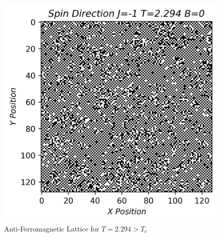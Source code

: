 \documentclass[twocolumn]{article}
\begin{document}
\begin{figure}[H]
\caption{Anti-Ferromagnetic Lattice for $T=2.294>T_c$}
\centering
\includegraphics[scale=.55]{AntiFerro3T=2294}
\end{figure}
\end{document}
